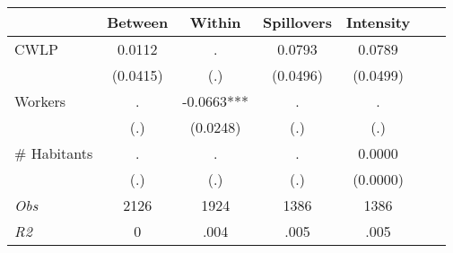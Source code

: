 \begin{tabular}{l*{6}{c}}\hline&\multicolumn{1}{c}{Between}&\multicolumn{1}{c}{Within}&\multicolumn{1}{c}{Spillovers}&\multicolumn{1}{c}{Intensity}\\ \hline 
CWLP & 0.0112 & . & 0.0793 & 0.0789 \\
 & (0.0415) & (.) & (0.0496) & (0.0499) \\
Workers & . & -0.0663*** & . & . \\
 & (.) & (0.0248) & (.) & (.) \\
\# Habitants & . & . & . & 0.0000 \\
  & (.) & (.) & (.) & (0.0000) \\
\hline \textit{Obs} & 2126 & 1924 & 1386 & 1386  \\ \textit{R2} & 0 & .004 & .005 & .005 \\ \hline \end{tabular}
